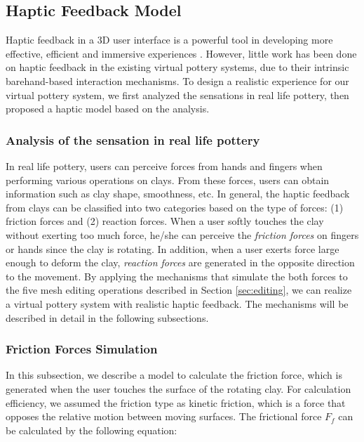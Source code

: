 \documentclass{svjour3}                     %
\begin{document}
{\color{blue}

\subsection{Haptic Feedback Model}
\label{sec:haptic}

Haptic feedback in a 3D user interface is a powerful tool in developing more effective, efficient and immersive experiences \cite{laviola20173d}.
However, little work has been done on haptic feedback in the existing virtual pottery systems, due to their intrinsic barehand-based interaction mechanisms.
To design a realistic experience for our virtual pottery system, we first analyzed the sensations in real life pottery, then proposed a haptic model based on the analysis.


\subsubsection{Analysis of the sensation in real life pottery}

In real life pottery, users can perceive forces from hands and fingers when performing various operations on clays.
From these forces, users can obtain information such as clay shape, smoothness, etc.
In general, the haptic feedback from clays can be classified into two categories based on the type of forces: (1) friction forces and (2) reaction forces.
When a user softly touches the clay without exerting too much force, he/she can perceive the \textit{friction forces} on fingers or hands since the clay is rotating.
In addition, when a user exerts force large enough to deform the clay, \textit{reaction forces} are generated in the opposite direction to the movement.
By applying the mechanisms that simulate the both forces to the five mesh editing operations described in Section \ref{sec:editing}, we can realize a virtual pottery system with realistic haptic feedback.
The mechanisms will be described in detail in the following subsections.


\subsubsection{Friction Forces Simulation}

In this subsection, we describe a model to calculate the friction force, which is generated when the user touches the surface of the rotating clay.
For calculation efficiency, we assumed the friction type as kinetic friction, which is a force that opposes the relative motion between moving surfaces.
The frictional force $F_{f}$ can be calculated by the following equation:

}
\end{document}
